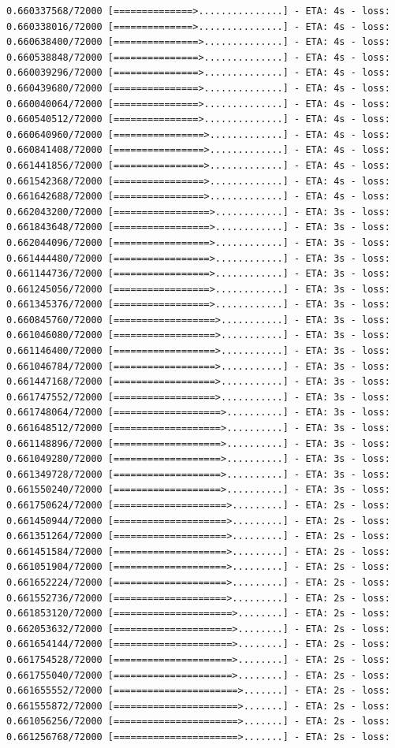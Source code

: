 \documentclass[12pt,fleqn]{article}\usepackage{../../common}
\begin{document}
\begin{verbatim}
0.660337568/72000 [==============>...............] - ETA: 4s - loss: 0.660338016/72000 [==============>...............] - ETA: 4s - loss: 0.660638400/72000 [===============>..............] - ETA: 4s - loss: 0.660538848/72000 [===============>..............] - ETA: 4s - loss: 0.660039296/72000 [===============>..............] - ETA: 4s - loss: 0.660439680/72000 [===============>..............] - ETA: 4s - loss: 0.660040064/72000 [===============>..............] - ETA: 4s - loss: 0.660540512/72000 [===============>..............] - ETA: 4s - loss: 0.660640960/72000 [================>.............] - ETA: 4s - loss: 0.660841408/72000 [================>.............] - ETA: 4s - loss: 0.661441856/72000 [================>.............] - ETA: 4s - loss: 0.661542368/72000 [================>.............] - ETA: 4s - loss: 0.661642688/72000 [================>.............] - ETA: 4s - loss: 0.662043200/72000 [=================>............] - ETA: 3s - loss: 0.661843648/72000 [=================>............] - ETA: 3s - loss: 0.662044096/72000 [=================>............] - ETA: 3s - loss: 0.661444480/72000 [=================>............] - ETA: 3s - loss: 0.661144736/72000 [=================>............] - ETA: 3s - loss: 0.661245056/72000 [=================>............] - ETA: 3s - loss: 0.661345376/72000 [=================>............] - ETA: 3s - loss: 0.660845760/72000 [==================>...........] - ETA: 3s - loss: 0.661046080/72000 [==================>...........] - ETA: 3s - loss: 0.661146400/72000 [==================>...........] - ETA: 3s - loss: 0.661046784/72000 [==================>...........] - ETA: 3s - loss: 0.661447168/72000 [==================>...........] - ETA: 3s - loss: 0.661747552/72000 [==================>...........] - ETA: 3s - loss: 0.661748064/72000 [===================>..........] - ETA: 3s - loss: 0.661648512/72000 [===================>..........] - ETA: 3s - loss: 0.661148896/72000 [===================>..........] - ETA: 3s - loss: 0.661049280/72000 [===================>..........] - ETA: 3s - loss: 0.661349728/72000 [===================>..........] - ETA: 3s - loss: 0.661550240/72000 [===================>..........] - ETA: 3s - loss: 0.661750624/72000 [====================>.........] - ETA: 2s - loss: 0.661450944/72000 [====================>.........] - ETA: 2s - loss: 0.661351264/72000 [====================>.........] - ETA: 2s - loss: 0.661451584/72000 [====================>.........] - ETA: 2s - loss: 0.661051904/72000 [====================>.........] - ETA: 2s - loss: 0.661652224/72000 [====================>.........] - ETA: 2s - loss: 0.661552736/72000 [====================>.........] - ETA: 2s - loss: 0.661853120/72000 [=====================>........] - ETA: 2s - loss: 0.662053632/72000 [=====================>........] - ETA: 2s - loss: 0.661654144/72000 [=====================>........] - ETA: 2s - loss: 0.661754528/72000 [=====================>........] - ETA: 2s - loss: 0.661755040/72000 [=====================>........] - ETA: 2s - loss: 0.661655552/72000 [======================>.......] - ETA: 2s - loss: 0.661555872/72000 [======================>.......] - ETA: 2s - loss: 0.661056256/72000 [======================>.......] - ETA: 2s - loss: 0.661256768/72000 [======================>.......] - ETA: 2s - loss: 
\end{verbatim}
\end{document}
